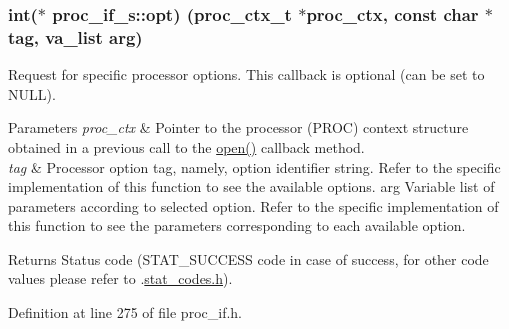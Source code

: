 \subsubsection[{\texorpdfstring{opt}{opt}}]{\setlength{\rightskip}{0pt plus 5cm}int($\ast$ proc\+\_\+if\+\_\+s\+::opt) ({\bf proc\+\_\+ctx\+\_\+t} $\ast$proc\+\_\+ctx, const char $\ast$tag, va\+\_\+list arg)}\hypertarget{structproc__if__s_a4ca0939d6721f368d2560851197fca36}{}\label{structproc__if__s_a4ca0939d6721f368d2560851197fca36}
Request for specific processor options. This callback is optional (can be set to N\+U\+LL). 
\begin{DoxyParams}{Parameters}
{\em proc\+\_\+ctx} & Pointer to the processor (P\+R\+OC) context structure obtained in a previous call to the \textquotesingle{}\hyperlink{structproc__if__s_a34999576771394dfb721463c8455ba06}{open()}\textquotesingle{} callback method. \\
\hline
{\em tag} & Processor option tag, namely, option identifier string. Refer to the specific implementation of this function to see the available options. arg Variable list of parameters according to selected option. Refer to the specific implementation of this function to see the parameters corresponding to each available option. \\
\hline
\end{DoxyParams}
\begin{DoxyReturn}{Returns}
Status code (S\+T\+A\+T\+\_\+\+S\+U\+C\+C\+E\+SS code in case of success, for other code values please refer to .\hyperlink{stat__codes_8h}{stat\+\_\+codes.\+h}). 
\end{DoxyReturn}


Definition at line 275 of file proc\+\_\+if.\+h.

